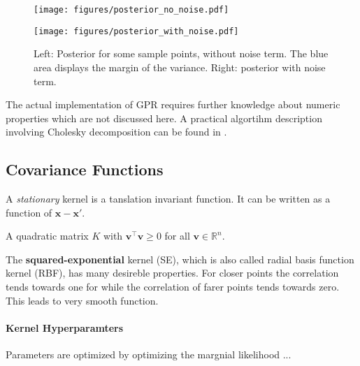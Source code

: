 \documentclass[english]{article}
\newcommand{\x}{\mathbf{x}}
\begin{document}
\begin{figure}

  \begin{minipage}{0.5\textwidth}
  \texttt{[image: figures/posterior\_no\_noise.pdf]}
  \end{minipage}%
  \begin{minipage}{0.5\textwidth}
  \texttt{[image: figures/posterior\_with\_noise.pdf]}
  \end{minipage}%

  \caption{Left: Posterior for some sample points, without noise term. The blue area displays the margin of the variance. Right: posterior with noise term.}

\end{figure}


The actual implementation of \ac{GPR} requires further knowledge about numeric properties which are not discussed here. A practical algortihm description involving Cholesky decomposition can be found in \cite[Algorithm 2.1]{rasmussen_gaussian_2006}.




\subsection{Covariance Functions}

A \textit{stationary} kernel is a tanslation invariant function. It can be written as a function of $\x-\x'$.

A quadratic matrix $K$ with $\mathbf{v}^\top \mathbf{v} \ge 0$ for all $\mathbf{v} \in \mathbb{R}^n$.

The \textbf{squared-exponential} kernel (SE), which is also called radial basis function kernel (RBF), has many desireble properties. For closer points the correlation tends towards one for while the correlation of farer points tends towards zero. This leads to very smooth function.

\paragraph{Kernel Hyperparamters}
Parameters are optimized by optimizing the margnial likelihood ...
\end{document}
